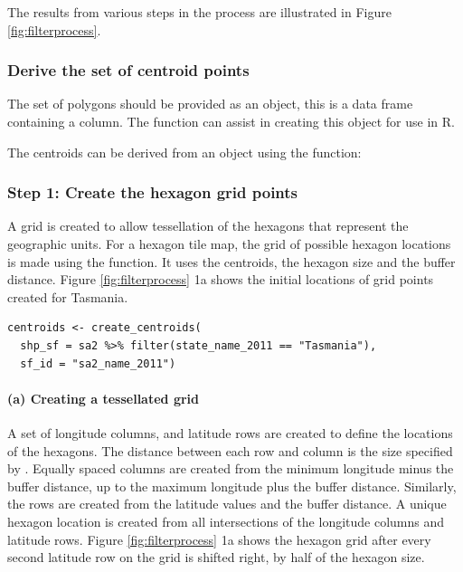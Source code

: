 The results from various steps in the process are illustrated in Figure \ref{fig:filterprocess}.

\hypertarget{derive-the-set-of-centroid-points}{%
\subsubsection{Derive the set of centroid points}\label{derive-the-set-of-centroid-points}}

The set of polygons should be provided as an  object, this is a data frame containing a  column. The  function can assist in creating this object for use in R.

The centroids can be derived from an  object using the  function:

\hypertarget{step-1-create-the-hexagon-grid-points}{%
\subsubsection{Step 1: Create the hexagon grid points}\label{step-1-create-the-hexagon-grid-points}}

A grid is created to allow tessellation of the hexagons that represent the geographic units. For a hexagon tile map, the grid of possible hexagon locations is made using the  function. It uses the centroids, the hexagon size and the buffer distance. Figure \ref{fig:filterprocess} 1a shows the initial locations of grid points created for Tasmania.

\begin{verbatim}
centroids <- create_centroids(
  shp_sf = sa2 %>% filter(state_name_2011 == "Tasmania"), 
  sf_id = "sa2_name_2011")
\end{verbatim}

\hypertarget{a-creating-a-tessellated-grid}{%
\paragraph{(a) Creating a tessellated grid}\label{a-creating-a-tessellated-grid}}

A set of longitude columns, and latitude rows are created to define the locations of the hexagons. The distance between each row and column is the size specified by . Equally spaced columns are created from the minimum longitude minus the buffer distance, up to the maximum longitude plus the buffer distance. Similarly, the rows are created from the latitude values and the buffer distance. A unique hexagon location is created from all intersections of the longitude columns and latitude rows. Figure \ref{fig:filterprocess} 1a shows the hexagon grid after every second latitude row on the grid is shifted right, by half of the hexagon size.

